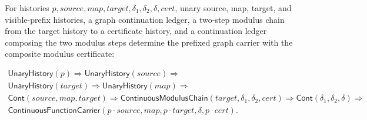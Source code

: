 \begin{theorem}
\label{thm:continuous-function-carrier-prefixed-graph-chain-closed}
For histories $p,source,map,target,\delta_1,\delta_2,\delta,cert$, unary
source, map, target, and visible-prefix histories, a graph continuation ledger,
a two-step modulus chain from the target history to a certificate history, and a
continuation ledger composing the two modulus steps determine the prefixed graph
carrier with the composite modulus certificate:

$$
\begin{array}{l}
\mathsf{UnaryHistory}(p)
\Longrightarrow
\mathsf{UnaryHistory}(source)
\Longrightarrow
\\
\mathsf{UnaryHistory}(target)
\Longrightarrow
\mathsf{UnaryHistory}(map)
\Longrightarrow
\\
\mathsf{Cont}(source,map,target)
\Longrightarrow
\mathsf{ContinuousModulusChain}(target,\delta_1,\delta_2,cert)
\Longrightarrow
\mathsf{Cont}(\delta_1,\delta_2,\delta)
\Longrightarrow
\\
\mathsf{ContinuousFunctionCarrier}(p\cdot source,map,p\cdot target,\delta,p\cdot cert).
\end{array}
$$
\end{theorem}

